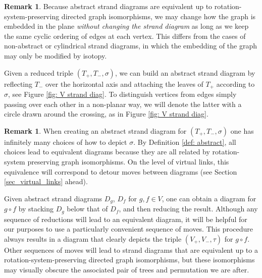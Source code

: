 \documentclass[11pt, twoside]{amsart}
\numberwithin{equation}{section}
\theoremstyle{definition}
\newtheorem{remark}[theorem]{Remark}
\numberwithin{equation}{section}
\begin{document}
\begin{remark} Because abstract strand diagrams are equivalent up to rotation-system-preserving directed graph isomorphisms, we may change how the graph is embedded in the plane \textit{without changing the strand diagram} as long as we keep the same cyclic ordering of edges at each vertex. This differs from the cases of non-abstract or cylindrical strand diagrams, in which the embedding of the graph may only be modified by isotopy.
\end{remark}

Given a reduced triple $(T_+,T_-,\sigma)$, we can build an abstract strand diagram by reflecting $T_-$ over the horizontal axis and attaching the leaves of $T_+$ according to $\sigma$, see Figure \ref{fig: V strand diag}. To distinguish vertices from edges simply passing over each other in a non-planar way, we will denote the latter with a circle drawn around the crossing, as in Figure \ref{fig: V strand diag}.

\begin{remark}
    When creating an abstract strand diagram for $(T_+,T_-,\sigma)$ one has infinitely many choices of how to depict $\sigma$. By Definition \ref{def: abstract}, all choices lead to equivalent diagrams because they are all related by rotation-system preserving graph isomorphisms. On the level of virtual links, this equivalence will correspond to detour moves between diagrams (see Section \ref{sec_virtual_links} ahead).
\end{remark}
 Given abstract strand diagrams $D_g$, $D_f$ for $g, f\in V$, one can obtain a diagram for $g \circ f$ by stacking $D_g$ below that of $D_f$, and then reducing the result. Although any sequence of reductions will lead to an equivalent diagram, it will be helpful for our purposes to use a particularly convenient sequence of moves. This procedure always results in a diagram that clearly depicts the triple $(V_+,V_-,\tau)$ for $g \circ f$. Other sequences of moves will lead to strand diagrams that are equivalent up to a rotation-system-preserving directed graph isomorphisms, but these isomorphisms may visually obscure the associated pair of trees and permutation we are after.
\end{document}

